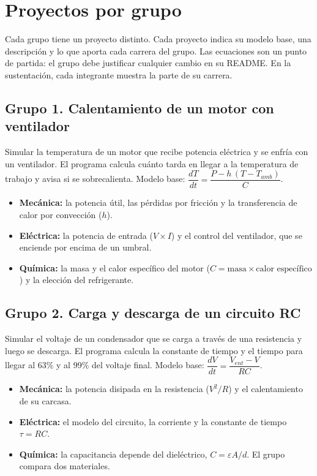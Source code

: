 \documentclass[doc]{apa6}
\begin{document}
\section*{Proyectos por grupo}
Cada grupo tiene un proyecto distinto. Cada proyecto indica su modelo base, una descripción y lo que aporta cada carrera del grupo. Las ecuaciones son un punto de partida: el grupo debe justificar cualquier cambio en su README. En la sustentación, cada integrante muestra la parte de su carrera.

\subsection*{Grupo 1. Calentamiento de un motor con ventilador}
Simular la temperatura de un motor que recibe potencia eléctrica y se enfría con un ventilador. El programa calcula cuánto tarda en llegar a la temperatura de trabajo y avisa si se sobrecalienta. Modelo base: $\dfrac{dT}{dt}=\dfrac{P-h\,(T-T_{amb})}{C}$.
\begin{itemize}
    \item \textbf{Mecánica:} la potencia útil, las pérdidas por fricción y la transferencia de calor por convección ($h$).
    \item \textbf{Eléctrica:} la potencia de entrada ($V\times I$) y el control del ventilador, que se enciende por encima de un umbral.
    \item \textbf{Química:} la masa y el calor específico del motor ($C=\text{masa}\times\text{calor específico}$) y la elección del refrigerante.
\end{itemize}

\subsection*{Grupo 2. Carga y descarga de un circuito RC}
Simular el voltaje de un condensador que se carga a través de una resistencia y luego se descarga. El programa calcula la constante de tiempo y el tiempo para llegar al 63\% y al 99\% del voltaje final. Modelo base: $\dfrac{dV}{dt}=\dfrac{V_{ent}-V}{RC}$.
\begin{itemize}
    \item \textbf{Mecánica:} la potencia disipada en la resistencia ($V^2/R$) y el calentamiento de su carcasa.
    \item \textbf{Eléctrica:} el modelo del circuito, la corriente y la constante de tiempo $\tau=RC$.
    \item \textbf{Química:} la capacitancia depende del dieléctrico, $C=\varepsilon A/d$. El grupo compara dos materiales.
\end{itemize}
\end{document}
